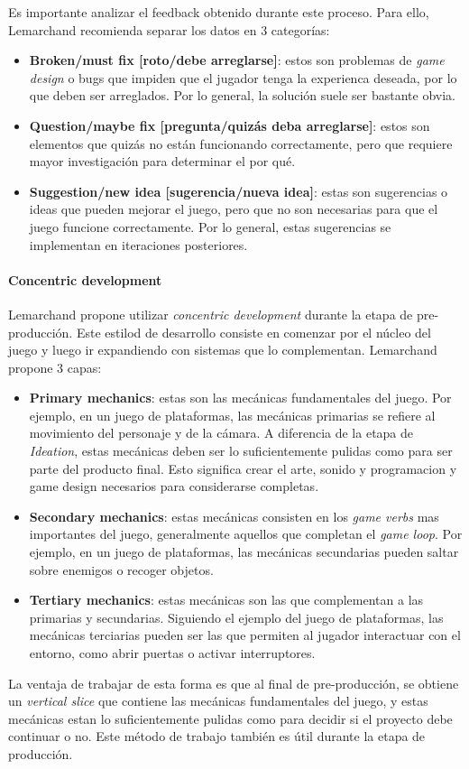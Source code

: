 \par Es importante analizar el feedback obtenido durante este proceso. Para ello, Lemarchand recomienda separar los datos en 3 categorías:
\begin{itemize}
    \item \textbf{Broken/must fix [roto/debe arreglarse]}: estos son problemas de \textit{game design} o bugs que impiden que el jugador tenga la experienca deseada, por lo que deben ser arreglados. Por lo general, la solución suele ser bastante obvia.
    \item \textbf{Question/maybe fix [pregunta/quizás deba arreglarse]}: estos son elementos que quizás no están funcionando correctamente, pero que requiere mayor investigación para determinar el por qué.
    \item \textbf{Suggestion/new idea [sugerencia/nueva idea]}: estas son sugerencias o ideas que pueden mejorar el juego, pero que no son necesarias para que el juego funcione correctamente. Por lo general, estas sugerencias se implementan en iteraciones posteriores.
\end{itemize}
%
%
\paragraph{Concentric development}
\par Lemarchand propone utilizar \textit{concentric development} durante la etapa de pre-producción. Este estilod de desarrollo consiste en comenzar por el núcleo del juego y luego ir expandiendo con sistemas que lo complementan. Lemarchand propone 3 capas:
\begin{itemize}
    \item \textbf{Primary mechanics}: estas son las mecánicas fundamentales del juego. Por ejemplo, en un juego de plataformas, las mecánicas primarias se refiere al movimiento del personaje y de la cámara. A diferencia de la etapa de \textit{Ideation}, estas mecánicas deben ser lo suficientemente pulidas como para ser parte del producto final. Esto significa crear el arte, sonido y programacion y game design necesarios para considerarse completas.
    \item \textbf{Secondary mechanics}: estas mecánicas consisten en los \textit{game verbs} mas importantes del juego, generalmente aquellos que completan el \textit{game loop}. Por ejemplo, en un juego de plataformas, las mecánicas secundarias pueden saltar sobre enemigos o recoger objetos.
    \item \textbf{Tertiary mechanics}: estas mecánicas son las que complementan a las primarias y secundarias. Siguiendo el ejemplo del juego de plataformas, las mecánicas terciarias pueden ser las que permiten al jugador interactuar con el entorno, como abrir puertas o activar interruptores.
\end{itemize}
\par La ventaja de trabajar de esta forma es que al final de pre-producción, se obtiene un \textit{vertical slice} que contiene las mecánicas fundamentales del juego, y estas mecánicas estan lo suficientemente pulidas como para decidir si el proyecto debe continuar o no. Este método de trabajo también es útil durante la etapa de producción. 
%
%
